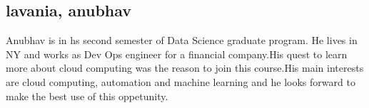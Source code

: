 \subsection{lavania, anubhav}

Anubhav is in hs second semester of Data Science graduate program. He
lives in NY and works as Dev Ops engineer for a financial company.His
quest to learn more about cloud computing was the reason to join this
course.His main interests are cloud computing, automation and machine
learning and he looks forward to make the best use of this oppetunity.
